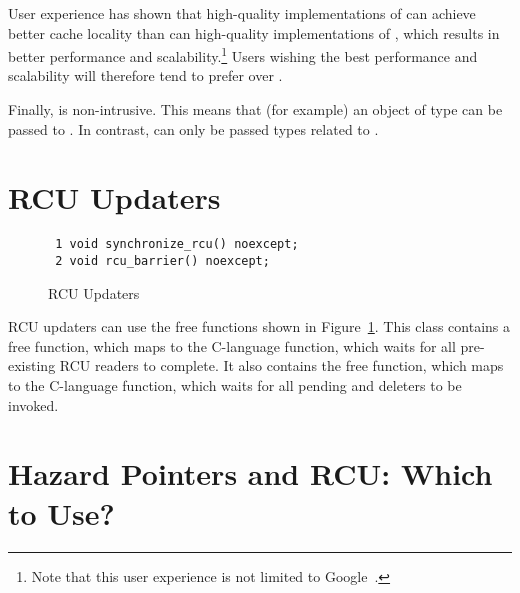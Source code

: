\documentclass[letterpaper,10pt]{article}
\begin{document}
User experience has shown that high-quality implementations
of  can achieve better cache locality than can 
high-quality implementations of ,
which results in better performance and
scalability.\footnote{
	Note that this user experience is not limited to
	Google~\cite{MathieuDesnoyers2012URCU}.}
Users wishing the best performance and scalability will therefore tend
to prefer  over .

Finally,  is non-intrusive.
This means that (for example) an object of type  can be
passed to .
In contrast,  can only be passed types
related to .

\section{RCU Updaters}
\label{sec:RCU Updaters}

\begin{figure}[tbp]
{ \scriptsize
\begin{verbatim}
 1 void synchronize_rcu() noexcept;
 2 void rcu_barrier() noexcept;
\end{verbatim}
}
\caption{RCU Updaters}
\label{fig:RCU Updaters}
\end{figure}

RCU updaters can use the free functions shown in
Figure~\ref{fig:RCU Updaters}.
This class contains a  free function,
which maps to the C-language  function, which
waits for all pre-existing RCU readers to complete.
It also contains the  free function,
which maps to the C-language  function,
which waits for all pending  and 
deleters to be invoked.

\section{Hazard Pointers and RCU: Which to Use?}
\label{sec:Hazard Pointers and RCU: Which to Use?}
\end{document}
